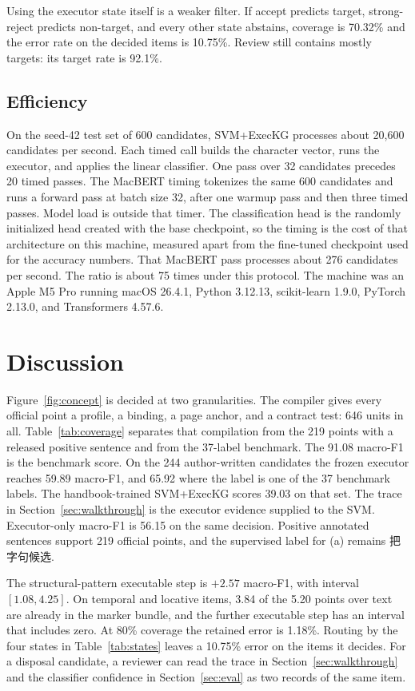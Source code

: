 \documentclass[pdflatex,sn-mathphys,NameDate]{sn-jnl}
\begin{document}
Using the executor state itself is a weaker filter.
If accept predicts target, strong-reject predicts non-target, and every other state abstains, coverage is 70.32\% and the error rate on the decided items is 10.75\%.
Review still contains mostly targets: its target rate is 92.1\%.

\subsection{Efficiency}

On the seed-42 test set of 600 candidates, SVM+ExecKG processes about 20,600 candidates per second.
Each timed call builds the character vector, runs the executor, and applies the linear classifier.
One pass over 32 candidates precedes 20 timed passes.
The MacBERT timing tokenizes the same 600 candidates and runs a forward pass at batch size 32, after one warmup pass and then three timed passes.
Model load is outside that timer.
The classification head is the randomly initialized head created with the base checkpoint, so the timing is the cost of that architecture on this machine, measured apart from the fine-tuned checkpoint used for the accuracy numbers.
That MacBERT pass processes about 276 candidates per second.
The ratio is about 75 times under this protocol.
The machine was an Apple M5 Pro running macOS 26.4.1, Python 3.12.13, scikit-learn 1.9.0, PyTorch 2.13.0, and Transformers 4.57.6.

\section{Discussion}
\label{sec:discussion}

Figure~\ref{fig:concept} is decided at two granularities.
The compiler gives every official point a profile, a binding, a page anchor, and a contract test: 646 units in all.
Table~\ref{tab:coverage} separates that compilation from the 219 points with a released positive sentence and from the 37-label benchmark.
The 91.08 macro-F1 is the benchmark score.
On the 244 author-written candidates the frozen executor reaches 59.89 macro-F1, and 65.92 where the label is one of the 37 benchmark labels.
The handbook-trained SVM+ExecKG scores 39.03 on that set.
The trace in Section~\ref{sec:walkthrough} is the executor evidence supplied to the SVM.
Executor-only macro-F1 is 56.15 on the same decision.
Positive annotated sentences support 219 official points, and the supervised label for (a) remains \mbox{把字句候选}.

The structural-pattern executable step is $+2.57$ macro-F1, with interval $[1.08, 4.25]$.
On temporal and locative items, 3.84 of the 5.20 points over text are already in the marker bundle, and the further executable step has an interval that includes zero.
At 80\% coverage the retained error is 1.18\%.
Routing by the four states in Table~\ref{tab:states} leaves a 10.75\% error on the items it decides.
For a disposal candidate, a reviewer can read the trace in Section~\ref{sec:walkthrough} and the classifier confidence in Section~\ref{sec:eval} as two records of the same item.
\end{document}
